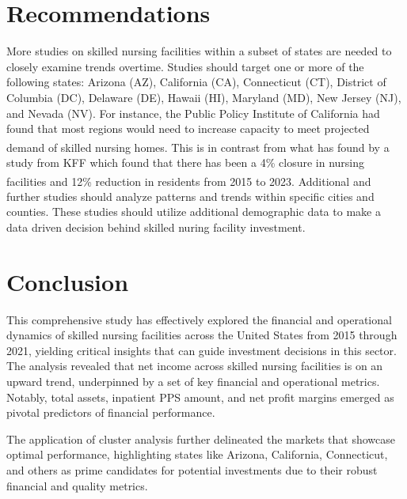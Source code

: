 \documentclass{article}
\theoremstyle{mytheoremstyle}
\theoremstyle{mytheoremstyle}
\theoremstyle{myproblemstyle}
\begin{document}
\pagebreak
\section{Recommendations}

More studies on skilled nursing facilities within a subset of states are needed to closely examine trends overtime. Studies should target one or more of the following states: Arizona (AZ), California (CA), Connecticut (CT), District of Columbia (DC), Delaware (DE), Hawaii (HI), Maryland (MD), New Jersey (NJ), and Nevada (NV). For instance, the Public Policy Institute of California had found that most regions would need to increase capacity to meet projected demand of skilled nursing homes\textsuperscript{\cite{ppic2024}}. This is in contrast from what has found by a study from KFF which found that there has been a 4\% closure in nursing facilities and 12\% reduction in residents from 2015 to 2023\textsuperscript{\cite{kff2024}}. Additional and further studies should analyze patterns and trends within specific cities and counties. These studies should utilize additional demographic data to make a data driven decision behind skilled nuring facility investment. 


\pagebreak
\section{Conclusion}
This comprehensive study has effectively explored the financial and operational dynamics of skilled nursing facilities across the United States from 2015 through 2021, yielding critical insights that can guide investment decisions in this sector. The analysis revealed that net income across skilled nursing facilities is on an upward trend, underpinned by a set of key financial and operational metrics. Notably, total assets, inpatient PPS amount, and net profit margins emerged as pivotal predictors of financial performance.

The application of cluster analysis further delineated the markets that showcase optimal performance, highlighting states like Arizona, California, Connecticut, and others as prime candidates for potential investments due to their robust financial and quality metrics. 
\end{document}
